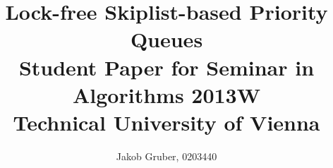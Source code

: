 \documentclass[a4paper,10pt]{article}
\title{Lock-free Skiplist-based Priority Queues \\
       Student Paper for Seminar in Algorithms 2013W \\
       Technical University of Vienna}
\author{Jakob Gruber, 0203440}
\begin{document}
\maketitle

\begin{comment}
Abstract formula
----------------

1) big picture problem or topic widely debated in your field.
2) gap in the literature on this topic.
3) your project filling the gap.
4) the specific material that you examine in the paper.
5) your original argument.
6) a strong concluding sentence.

Introduction formula
--------------------

A good paper introduction is fairly formulaic. If you follow a simple set of
rules, you can write a very good introduction. The following outline can be
varied. For example, you can use two paragraphs instead of one, or you can
place more emphasis on one aspect of the intro than another. But in all cases,
all of the points below need to be covered in an introduction, and in most
papers, you don't need to cover anything more in an introduction.

Paragraph 1: Motivation. At a high level, what is the problem area you are
working in and why is it important? It is important to set the larger context
here. Why is the problem of interest and importance to the larger community?

Paragraph 2: What is the specific problem considered in this paper? This
paragraph narrows down the topic area of the paper. In the first paragraph you
have established general context and importance. Here you establish specific
context and background.

Paragraph 3: "In this paper, we show that ...". This is the key paragraph in
the intro - you summarize, in one paragraph, what are the main contributions of
your paper given the context you have established in paragraphs 1 and 2. What
is the general approach taken? Why are the specific results significant? This
paragraph must be really really good. If you can't "sell" your work at a high
level in a paragraph in the intro, then you are in trouble. As a reader or
reviewer, this is the paragraph that I always look for, and read very
carefully.

You should think about how to structure this one or two paragraph summary of
what your paper is all about. If there are two or three main results, then you
might consider itemizing them with bullets or in test (e.g., "First, ..."). If
the results fall broadly into two categories, you can bring out that
distinction here. For example, "Our results are both theoretical and applied in
nature. (two sentences follow, one each on theory and application)"


\end{comment}
\end{document}
